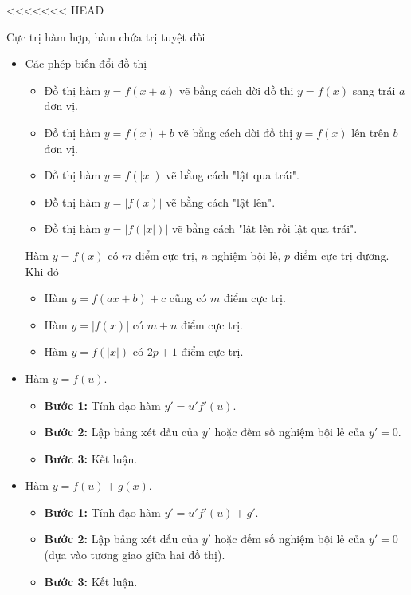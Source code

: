 <<<<<<< HEAD
\begin{dang}{Cực trị hàm hợp, hàm chứa trị tuyệt đối}
    \begin{itemize}
        \item Các phép biến đổi đồ thị
        \begin{itemize}
            \item Đồ thị hàm $y=f(x+a)$ vẽ bằng cách dời đồ thị $y=f(x)$ sang trái $a$ đơn vị.
            \item Đồ thị hàm $y=f(x)+b$ vẽ bằng cách dời đồ thị $y=f(x)$ lên trên $b$ đơn vị.
            \item Đồ thị hàm $y=f(|x|)$ vẽ bằng cách "lật qua trái".
            \item Đồ thị hàm $y=|f(x)|$ vẽ bằng cách "lật lên".
            \item Đồ thị hàm $y=|f(|x|)|$ vẽ bằng cách "lật lên rồi lật qua trái".
        \end{itemize}
        \begin{note} Hàm $y=f(x)$ có $m$ điểm cực trị, $n$ nghiệm bội lẻ, $p$ điểm cực trị dương. Khi đó
            \begin{itemize}
                \item[-]Hàm $y=f(ax+b)+c$ cũng có $m$ điểm cực trị.
                \item[-]	Hàm $y=|f(x)|$ có $m+n$  điểm cực trị.
                \item[-] 	Hàm $y=f(|x|)$ có $2p+1$  điểm cực trị.
            \end{itemize}
        \end{note}
        \item Hàm $y=f(u)$.
        \begin{itemize}
            \item \textbf{Bước 1: } Tính đạo hàm $y'=u'f'(u)$.
            \item \textbf{Bước 2: } Lập bảng xét dấu của $y'$ hoặc đếm số nghiệm bội lẻ của $y'=0$.
            \item \textbf{Bước 3: } Kết luận.
        \end{itemize}
        \item Hàm $y=f(u)+g(x)$.
        \begin{itemize}
            \item \textbf{Bước 1: } Tính đạo hàm $y'=u'f'(u)+g'$.
            \item \textbf{Bước 2: } Lập bảng xét dấu của $y'$ hoặc đếm số nghiệm bội lẻ của $y'=0$ (dựa vào tương giao giữa hai đồ thị).
            \item \textbf{Bước 3: } Kết luận.
        \end{itemize}
    \end{itemize}
\end{dang}
